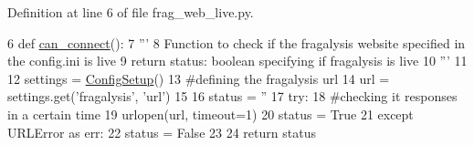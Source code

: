 Definition at line 6 of file frag\+\_\+web\+\_\+live.\+py.


\begin{DoxyCode}
6 \textcolor{keyword}{def }\hyperlink{namespacefragalysis__api_1_1xcextracter_1_1frag__web__live_a0c358bb08db16e67b947ea3e06a2516c}{can\_connect}():
7     \textcolor{stringliteral}{'''}
8 \textcolor{stringliteral}{    Function to check if the fragalysis website specified in the config.ini is live}
9 \textcolor{stringliteral}{    return status: boolean specifying if fragalysis is live}
10 \textcolor{stringliteral}{    '''}
11 
12     settings = \hyperlink{namespacefragalysis__api_1_1xcglobalscripts_1_1set__config_a9b5445f82604ad45c1e85e2b07e4a317}{ConfigSetup}()
13     \textcolor{comment}{#defining the fragalysis url}
14     url = settings.get(\textcolor{stringliteral}{'fragalysis'}, \textcolor{stringliteral}{'url'})
15 
16     status = \textcolor{stringliteral}{''}
17     \textcolor{keywordflow}{try}:
18         \textcolor{comment}{#checking it responses in a certain time}
19         urlopen(url, timeout=1)
20         status = \textcolor{keyword}{True}
21     \textcolor{keywordflow}{except} URLError \textcolor{keyword}{as} err:
22         status = \textcolor{keyword}{False}
23 
24     \textcolor{keywordflow}{return} status
\end{DoxyCode}
